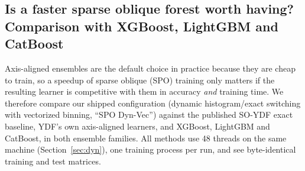 \subsection{Is a faster sparse oblique forest worth having? Comparison with XGBoost, LightGBM and CatBoost}
\label{sec:spo-vs-gbt}

Axis-aligned ensembles are the default choice in practice because they are cheap to train, so a
speedup of sparse oblique (SPO) training only matters if the resulting learner is competitive with
them in accuracy \emph{and} training time. We therefore compare our shipped configuration
(dynamic histogram/exact switching with vectorized binning, ``SPO Dyn-Vec'') against the
published SO-YDF exact baseline, YDF's own axis-aligned learners, and XGBoost, LightGBM and
CatBoost, in both ensemble families. All methods use 48 threads on the same machine
(Section~\ref{sec:dyn}), one training process per run, and see byte-identical training and test
matrices.


